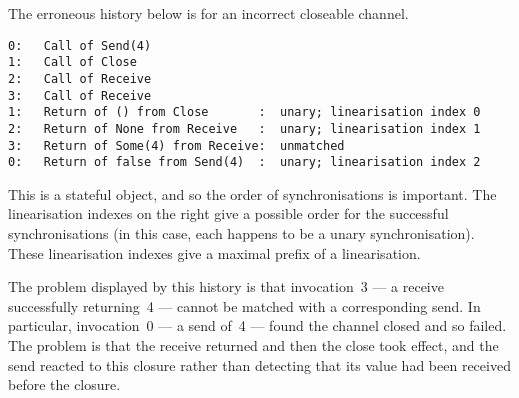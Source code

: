 

The erroneous history below is for an incorrect closeable channel.  
%
\begin{errorHistory}
\begin{verbatim}
0:   Call of Send(4)               
1:   Call of Close                 
2:   Call of Receive               
3:   Call of Receive               
1:   Return of () from Close       :  unary; linearisation index 0
2:   Return of None from Receive   :  unary; linearisation index 1
3:   Return of Some(4) from Receive:  unmatched
0:   Return of false from Send(4)  :  unary; linearisation index 2
\end{verbatim}
\end{errorHistory}
%
This is a stateful object, and so the order of synchronisations is important.
The linearisation indexes on the right give a possible order for the
successful synchronisations (in this case, each happens to be a unary
synchronisation).  These linearisation indexes give a maximal prefix of a
linearisation.

The problem displayed by this history is that invocation~3 --- a receive
successfully returning~4 --- cannot be matched with a corresponding send.  In
particular, invocation~0 --- a send of~4 --- found the channel closed and so
failed.  The problem is that the receive returned and then the close took
effect, and the send reacted to this closure rather than detecting that its
value had been received before the closure.


